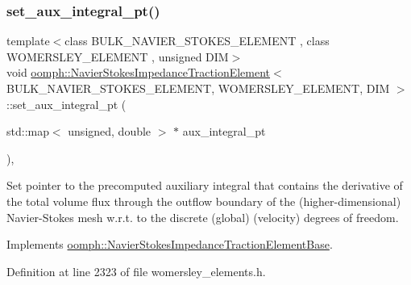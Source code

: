 \subsubsection{\texorpdfstring{set\+\_\+aux\+\_\+integral\+\_\+pt()}{set\_aux\_integral\_pt()}}
{\footnotesize\ttfamily template$<$class B\+U\+L\+K\+\_\+\+N\+A\+V\+I\+E\+R\+\_\+\+S\+T\+O\+K\+E\+S\+\_\+\+E\+L\+E\+M\+E\+NT , class W\+O\+M\+E\+R\+S\+L\+E\+Y\+\_\+\+E\+L\+E\+M\+E\+NT , unsigned D\+IM$>$ \\
void \hyperlink{classoomph_1_1NavierStokesImpedanceTractionElement}{oomph\+::\+Navier\+Stokes\+Impedance\+Traction\+Element}$<$ B\+U\+L\+K\+\_\+\+N\+A\+V\+I\+E\+R\+\_\+\+S\+T\+O\+K\+E\+S\+\_\+\+E\+L\+E\+M\+E\+NT, W\+O\+M\+E\+R\+S\+L\+E\+Y\+\_\+\+E\+L\+E\+M\+E\+NT, D\+IM $>$\+::set\+\_\+aux\+\_\+integral\+\_\+pt (\begin{DoxyParamCaption}\item[{std\+::map$<$ unsigned, double $>$ $\ast$}]{aux\+\_\+integral\+\_\+pt }\end{DoxyParamCaption})\hspace{0.3cm}{\ttfamily [inline]}, {\ttfamily [virtual]}}



Set pointer to the precomputed auxiliary integral that contains the derivative of the total volume flux through the outflow boundary of the (higher-\/dimensional) Navier-\/\+Stokes mesh w.\+r.\+t. to the discrete (global) (velocity) degrees of freedom. 



Implements \hyperlink{classoomph_1_1NavierStokesImpedanceTractionElementBase_ac9583fd74bc1bb57101bce20fffa39d3}{oomph\+::\+Navier\+Stokes\+Impedance\+Traction\+Element\+Base}.



Definition at line 2323 of file womersley\+\_\+elements.\+h.

\mbox{\label{classoomph_1_1NavierStokesImpedanceTractionElement_afd73c927eab27d77f54d83c67ef84a0f}} 
